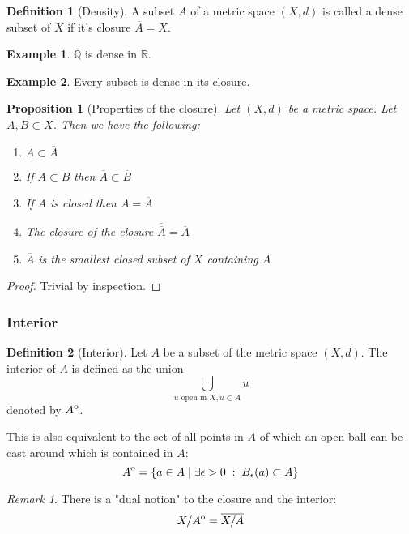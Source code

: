 \documentclass{article}
\theoremstyle{definition}
\newtheorem{defn}{Definition}[section]
\newtheorem{exmp}{Example}[section]
\theoremstyle{plain}%
\newtheorem{prop}[thm]{Proposition}
\theoremstyle{remark}
\newtheorem*{rem}{Remark}
\newcommand{\Union}{\bigcup}
\newcommand{\R}{\mathbb{R}}
\newcommand{\Q}{\mathbb{Q}}
\newcommand{\interior}[1]{%
  {\kern0pt#1}^{\mathrm{o}}%
}
\begin{document}
\begin{defn}[Density]
A subset $A$ of a metric space $(X,d)$ is called a dense subset of $X$ if it's closure $\overline{A} = X$.
\end{defn}

\begin{exmp}
$\Q$ is dense in $\R$.
\end{exmp}

\begin{exmp}
Every subset is dense in its closure.
\end{exmp}

\begin{prop}[Properties of the closure]
Let $(X,d)$ be a metric space. Let $A,B \subset X$. Then we have the following:
\begin{enumerate}
    \item $A \subset \overline{A}$
    \item If $A \subset B$ then $\overline{A} \subset \overline{B}$
    \item If $A$ is closed then $A = \overline{A}$
    \item The closure of the closure $\overline{\overline{A}} = \overline{A}$
    \item $\overline{A}$ is the smallest closed subset of $X$ containing $A$
\end{enumerate}
\end{prop}

\begin{proof}
Trivial by inspection.
\end{proof}

\subsubsection{Interior}

\begin{defn}[Interior]
Let $A$ be a subset of the metric space $(X, d)$. The interior of $A$ is defined as the union \[\Union_{u \text{ open in } X, u \subset A} u \] denoted by $\interior{A}$.

This is also equivalent to the set of all points in $A$ of which an open ball can be cast around which is contained in $A$:\[\interior{A} = \{a \in A \; | \; \exists \epsilon > 0 \; : \; B_{\epsilon}(a) \subset A\}\]
\end{defn}

\begin{rem}
There is a "dual notion" to the closure and the interior: \[X / \interior{A} = \overline{X / A}\]
\end{rem}
\end{document}
